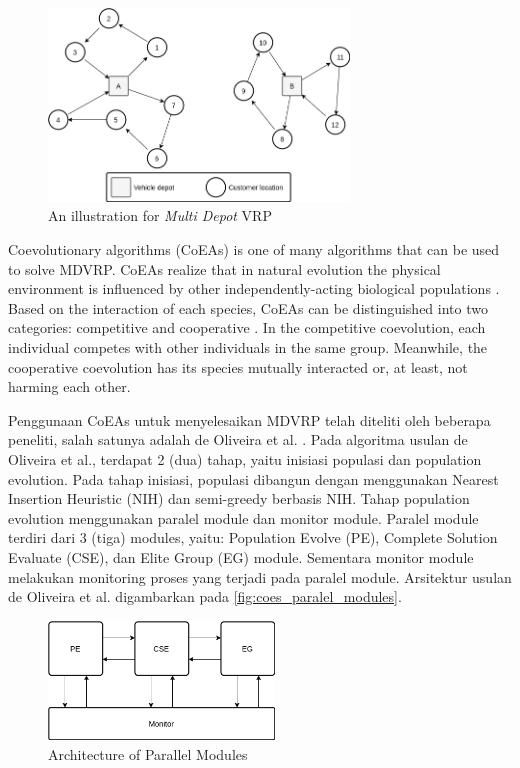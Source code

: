 \documentclass[conference]{IEEEtran}
\begin{document}
\begin{figure}[!]
	\centering
	\includegraphics[width=8cm]{Resources/Images/mdvrp-illustration}
	\caption{An illustration for \textit{Multi Depot} VRP}
	\label{fig:mdvrp-illustration}
\end{figure}

Coevolutionary algorithms (CoEAs) is one of many algorithms \cite{cordeau_tabu_1997} \cite{pisinger_general_2007} \cite{lau_application_2010} \cite{cordeau_parallel_2012} \cite{subramanian_hybrid_2013} \cite{vidal_implicit_2014} \cite{escobar_hybrid_2014} \cite{de_oliveira_cooperative_2016} that can be used to solve MDVRP. CoEAs realize that in natural evolution the physical environment is influenced by other independently-acting biological populations \cite{engelbrecht_coevolution_2007}. Based on the interaction of each species, CoEAs can be distinguished into two categories: competitive and cooperative \cite{engelbrecht_coevolution_2007}. In the competitive coevolution, each individual competes with other individuals in the same group. Meanwhile, the cooperative coevolution has its species mutually interacted or, at least, not harming each other.

Penggunaan CoEAs untuk menyelesaikan MDVRP telah diteliti oleh beberapa peneliti, salah satunya adalah de Oliveira et al. \cite{de_oliveira_cooperative_2016}. Pada algoritma usulan de Oliveira et al., terdapat 2 (dua) tahap, yaitu inisiasi populasi dan population evolution. Pada tahap inisiasi, populasi dibangun dengan menggunakan Nearest Insertion Heuristic (NIH) dan semi-greedy berbasis NIH. Tahap population evolution menggunakan paralel module dan monitor module. Paralel module terdiri dari 3 (tiga) modules, yaitu: Population Evolve (PE), Complete Solution Evaluate (CSE), dan Elite Group (EG) module. Sementara monitor module melakukan monitoring proses yang terjadi pada paralel module. Arsitektur usulan de Oliveira et al. digambarkan pada \autoref{fig:coes_paralel_modules}.

\begin{figure}[!]
	\centering
	\includegraphics[width=6cm]{Resources/Images/coes_paralel_modules}
	\caption{Architecture of Parallel Modules \cite{de_oliveira_cooperative_2016}}
	\label{fig:coes_paralel_modules}
\end{figure}
\end{document}

